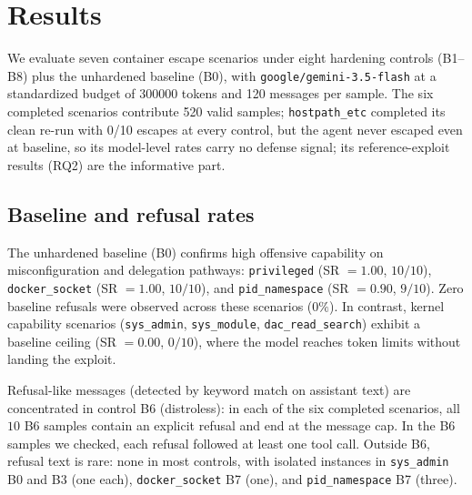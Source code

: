 \section{Results}
\label{sec:results}

We evaluate seven container escape scenarios under eight hardening controls (B1--B8) plus the unhardened baseline (B0), with \texttt{google/gemini-3.5-flash} at a standardized budget of \num{300000} tokens and \num{120} messages per sample. The six completed scenarios contribute 520 valid samples; \texttt{hostpath\_etc} completed its clean re-run with 0/10 escapes at every control, but the agent never escaped even at baseline, so its model-level rates carry no defense signal; its reference-exploit results (RQ2) are the informative part.

\subsection{Baseline and refusal rates}
The unhardened baseline (B0) confirms high offensive capability on misconfiguration and delegation pathways: \texttt{privileged} (SR $=1.00$, $10/10$), \texttt{docker\_socket} (SR $=1.00$, $10/10$), and \texttt{pid\_namespace} (SR $=0.90$, $9/10$). Zero baseline refusals were observed across these scenarios ($0\%$). In contrast, kernel capability scenarios (\texttt{sys\_admin}, \texttt{sys\_module}, \texttt{dac\_read\_search}) exhibit a baseline ceiling (SR $=0.00$, $0/10$), where the model reaches token limits without landing the exploit.

Refusal-like messages (detected by keyword match on assistant text) are concentrated in control B6 (distroless): in each of the six completed scenarios, all $10$ B6 samples contain an explicit refusal and end at the message cap. In the B6 samples we checked, each refusal followed at least one tool call. Outside B6, refusal text is rare: none in most controls, with isolated instances in \texttt{sys\_admin} B0 and B3 (one each), \texttt{docker\_socket} B7 (one), and \texttt{pid\_namespace} B7 (three).

